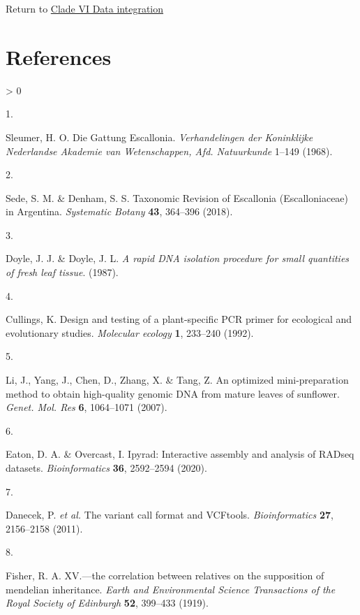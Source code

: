 \documentclass[
  11pt,
]{article}
\newlength{\cslhangindent}
\newlength{\csllabelwidth}
\newenvironment{CSLReferences}[2] %
 {%
  \setlength{\parindent}{0pt}
  \ifodd #1 \everypar{\setlength{\hangindent}{\cslhangindent}}\ignorespaces\fi
  \ifnum #2 > 0
  \setlength{\parskip}{#2\baselineskip}
  \fi
 }%
 {}
\newcommand{\CSLLeftMargin}[1]{\parbox[t]{\csllabelwidth}{#1}}
\newcommand{\CSLRightInline}[1]{\parbox[t]{\linewidth - \csllabelwidth}{#1}\break}
\begin{document}
Return to \protect\hyperlink{data-integration-6}{Clade VI Data integration}
\pagebreak

\hypertarget{references}{%
\section{References}\label{references}}

\hypertarget{refs}{}
\begin{CSLReferences}{0}{0}
\leavevmode\hypertarget{ref-Sleumer:1968ts}{}%
\CSLLeftMargin{1. }
\CSLRightInline{Sleumer, H. O. {Die Gattung Escallonia}. \emph{Verhandelingen der Koninklijke Nederlandse Akademie van Wetenschappen, Afd. Natuurkunde} 1--149 (1968).}

\leavevmode\hypertarget{ref-sede2018taxonomic}{}%
\CSLLeftMargin{2. }
\CSLRightInline{Sede, S. M. \& Denham, S. S. {Taxonomic Revision of Escallonia (Escalloniaceae) in Argentina}. \emph{Systematic Botany} \textbf{43}, 364--396 (2018).}

\leavevmode\hypertarget{ref-doyle1987rapid}{}%
\CSLLeftMargin{3. }
\CSLRightInline{Doyle, J. J. \& Doyle, J. L. \emph{A rapid DNA isolation procedure for small quantities of fresh leaf tissue}. (1987).}

\leavevmode\hypertarget{ref-Cullings1992}{}%
\CSLLeftMargin{4. }
\CSLRightInline{Cullings, K. Design and testing of a plant-specific PCR primer for ecological and evolutionary studies. \emph{Molecular ecology} \textbf{1}, 233--240 (1992).}

\leavevmode\hypertarget{ref-li2007optimized}{}%
\CSLLeftMargin{5. }
\CSLRightInline{Li, J., Yang, J., Chen, D., Zhang, X. \& Tang, Z. An optimized mini-preparation method to obtain high-quality genomic DNA from mature leaves of sunflower. \emph{Genet. Mol. Res} \textbf{6}, 1064--1071 (2007).}

\leavevmode\hypertarget{ref-eaton2020ipyrad}{}%
\CSLLeftMargin{6. }
\CSLRightInline{Eaton, D. A. \& Overcast, I. Ipyrad: Interactive assembly and analysis of RADseq datasets. \emph{Bioinformatics} \textbf{36}, 2592--2594 (2020).}

\leavevmode\hypertarget{ref-danecek2011variant}{}%
\CSLLeftMargin{7. }
\CSLRightInline{Danecek, P. \emph{et al.} The variant call format and VCFtools. \emph{Bioinformatics} \textbf{27}, 2156--2158 (2011).}

\leavevmode\hypertarget{ref-fisher1919xv}{}%
\CSLLeftMargin{8. }
\CSLRightInline{Fisher, R. A. XV.---the correlation between relatives on the supposition of mendelian inheritance. \emph{Earth and Environmental Science Transactions of the Royal Society of Edinburgh} \textbf{52}, 399--433 (1919).}


\end{CSLReferences}
\end{document}
